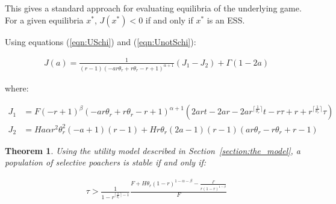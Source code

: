 \documentclass[10pt]{article}
\newtheorem{theorem}{Theorem}
\begin{document}
This gives a standard approach for evaluating equilibria of the underlying game.
For a given equilibria \(x^*\), \(J(x^*)<0\) if and only if \(x^*\) is an ESS\@.

Using equations (\ref{eqn:USchi}) and (\ref{eqn:UnotSchi}):

\begin{equation}
    \begin{split}
    J(a) = \frac{1}{\left(r - 1\right) \left(- a r \theta_{r} + r \theta_{r} - r
+ 1\right)^{\alpha + 1}} \left(J_1 - J_2 \right) + \Gamma(1 - 2a)
    \end{split}
\end{equation}


where:

\begin{equation*}
    \begin{split}
    J_1 & = F \left(- r + 1\right)^{\beta} \left(- a r \theta_{r} + r \theta_{r}
    - r + 1\right)^{\alpha + 1} \left(2 a r t - 2 a r - 2 a
r^{\lceil{\frac{1}{\theta_{r}}}\rceil} t - r \tau + r +
r^{\lceil{\frac{1}{\theta_{r}}}\rceil} \tau\right)\\
    J_2 & = H a \alpha r^{2} \theta_{r}^{2} \left(- a + 1\right) \left(r - 1\right) + H r \theta_{r} \left(2 a - 1\right) \left(r - 1\right) \left(a r \theta_{r} - r \theta_{r} + r - 1\right)
    \end{split}
\end{equation*}


\begin{theorem}\label{theorem:selective}
Using the utility model described in Section~\ref{section:the_model},
a population of selective poachers is stable if and only if:

\begin{equation}
    \begin{split}\label{eq:selective_stability}
    \tau > \frac{1}{1 - r^{\lceil{\frac{1}{\theta_{r}}}\rceil - 1}}
    \frac{F + H \theta_{r} (1 - r) ^{1- \alpha -\beta}-\frac{\Gamma}{r(1-r)^{1-\beta}}}{F}
\end{split}
\end{equation}
\end{theorem}
\end{document}
